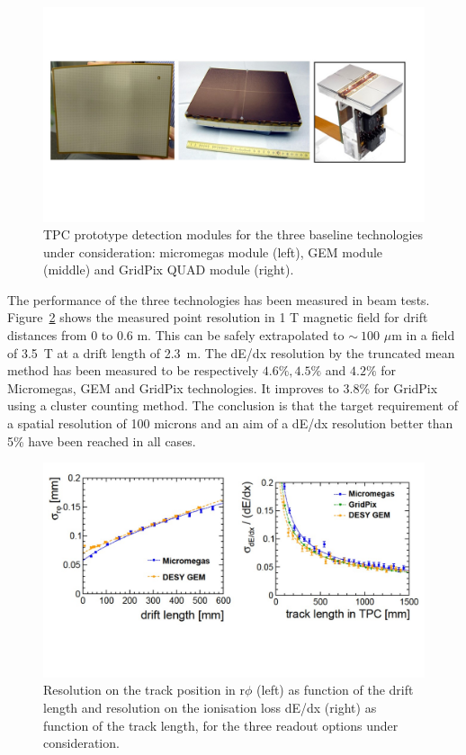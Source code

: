 \begin{figure}[t!]
\centering
\includegraphics[width=1.0\hsize]{Detector/fig/TPC_prototypes.jpg}
\caption{TPC prototype detection modules for the three baseline technologies under consideration: micromegas module (left), GEM module (middle) and GridPix QUAD module (right).}
\label{fig:det:TPC_prototypes}
\end{figure}

The performance of the three technologies has been measured in beam tests. Figure~\ref{fig:det:TPC_performances} shows the measured point resolution in 1 T magnetic field for drift distances from 0 to 0.6 m. This can be safely extrapolated to $\sim~100$ $\mu$m in a field of 3.5~T at a drift length of 2.3~m. The dE/dx resolution by the truncated mean method has been measured to be respectively $4.6\%, 4.5\%$ and $4.2\%$ for Micromegas, GEM and GridPix technologies. It improves to $3.8\%$ for GridPix using a cluster counting method. The conclusion is that the target requirement of a spatial resolution of 100 microns and an aim of a dE/dx resolution better than 5\% have been reached in all cases.   


\begin{figure}[t!]
\centering
\includegraphics[width=1.0\hsize]{Detector/fig/TPC_performances.jpg}
\caption{Resolution on the track position in r$\phi$ (left) as function of the drift length and resolution on the ionisation loss dE/dx (right) as function of the track length, for the three readout options under consideration.}
\label{fig:det:TPC_performances}
\end{figure}

